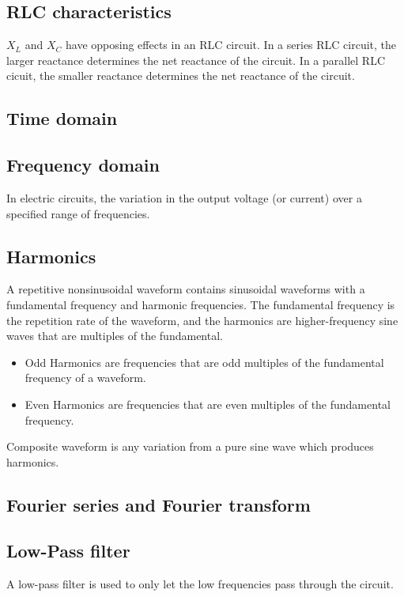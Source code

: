 \subsection{RLC characteristics}
$X_L$ and $X_C$ have opposing effects in an RLC circuit. In a series RLC circuit, the larger reactance determines the net reactance of the circuit. In a parallel RLC cicuit, the smaller reactance determines the net reactance of the circuit. 

\subsection{Time domain}


\subsection{Frequency domain}
In electric circuits, the variation in the output voltage (or current) over a specified range of frequencies.

\subsection{Harmonics}
A repetitive nonsinusoidal waveform contains sinusoidal waveforms with a fundamental frequency and harmonic frequencies. The fundamental frequency is the repetition rate of the waveform, and the harmonics are higher-frequency sine waves that are multiples of the fundamental. 
\begin{itemize}
    \item Odd Harmonics are frequencies that are odd multiples of the fundamental frequency of a waveform.
    
    \item Even Harmonics are frequencies that are even multiples of the fundamental frequency. 
\end{itemize}
Composite waveform is any variation from a pure sine wave which produces harmonics. 

\subsection{Fourier series and Fourier transform}


\subsection{Low-Pass filter}
A low-pass filter is used to only let the low frequencies pass through the circuit. 


